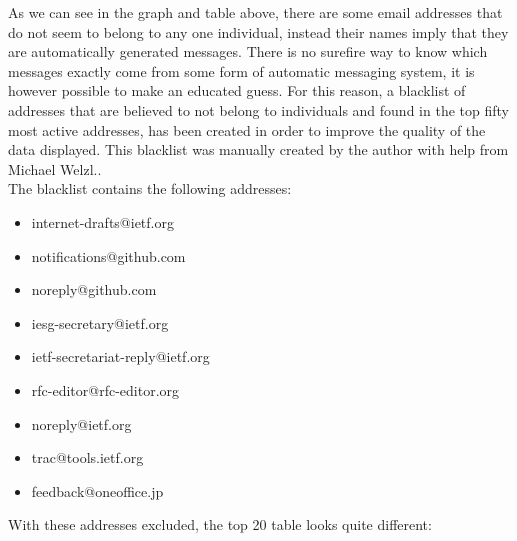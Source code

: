 \documentclass[a4paper,english]{report}
\begin{document}
As we can see in the graph and table above, there are some email addresses that do not seem to belong to any one individual, instead their names imply that they are automatically generated messages. There is no surefire way to know which messages exactly come from some form of automatic messaging system, it is however possible to make an educated guess. For this reason, a blacklist of addresses that are believed to not belong to individuals and found in the top fifty most active addresses, has been created in order to improve the quality of the data displayed. This blacklist was manually created by the author with help from Michael Welzl..\\


The blacklist contains the following addresses: 

\begin{itemize}
\item internet-drafts@ietf.org
\item notifications@github.com
\item noreply@github.com
\item iesg-secretary@ietf.org
\item ietf-secretariat-reply@ietf.org
\item rfc-editor@rfc-editor.org
\item noreply@ietf.org
\item trac@tools.ietf.org
\item feedback@oneoffice.jp


\end{itemize}

With these addresses excluded, the top 20 table looks quite different: 
\end{document}
